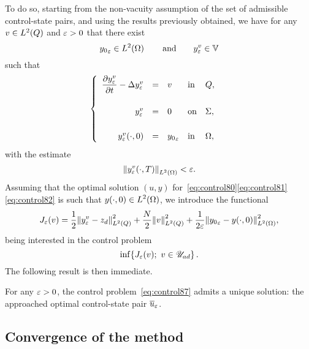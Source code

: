 To do so, starting from the non-vacuity assumption of the set of admissible
control-state pairs, and using the results previously obtained, we have for
any $v\in L^{2}\!\left({Q}\right)$ and $\varepsilon > 0$ that there exist
\begin{equation*}
    {y_{0}}_{\varepsilon}\in L^{2}\!\left({\Omega}\right)\qquad\text{and}\qquad y_{\varepsilon}^{v}\in
    \mathbb{V}
\end{equation*}
such that
\begin{equation*}
    \begin{cases}\displaystyle
        \begin{array}{rclll}
            \dfrac{\partial{}y_{\varepsilon}^{v}}{\partial{}t} - \Delta y_{\varepsilon}^{v} & = & v &
            \text{in} & Q,\\
            \\
            y_{\varepsilon}^{v} & = & 0 & \text{on} & \Sigma,\\
            \\
            {y_{\varepsilon}^{v}}\!\left({\cdot, 0}\right) & = & {y_{0}}_{\varepsilon} &
            \text{in} & \Omega,
        \end{array}
    \end{cases}
\end{equation*}
with the estimate
\begin{equation*}
    \normeohm{%
        \condfinale{y_{\veps}^{v}}
    } < \veps.
\end{equation*}
Assuming that the optimal solution $(u,y)$
for~\eqref{eq:control80}\eqref{eq:control81}\eqref{eq:control82} is such
that $\displaystyle {y}\!\left({\cdot, 0}\right)\in L^{2}\!\left({\Omega}\right)$, we introduce the
functional
\begin{equation*}
    J_{\varepsilon}(v) = \dfrac{1}{2}{\left\|{y_{\varepsilon}^{v} - z_{d} }\right\|}_{L^{2}\left({Q}\right)}^{2} +
    \dfrac{N}{2}{\left\|{v }\right\|}_{L^{2}\left({Q}\right)}^{2} + \dfrac{1}{2\varepsilon}{\left\|{{y_{0}}_{\varepsilon} -
    {y}\!\left({\cdot, 0}\right) }\right\|}_{L^{2}\left({\Omega}\right)}^{2},
\end{equation*}
being interested in the control problem
\begin{equation}\label{eq:control87}
    \inf\!\left\{{%
        J_{\veps}(v);\ v\in\uad
    }\right\}.
\end{equation}
The following result is then immediate.

\begin{proposition}%
    For any $\varepsilon > 0$, the control problem~\eqref{eq:control87} admits a
    unique solution: the approached optimal control-state pair ${\overline{u}}_{\varepsilon}$.
\end{proposition}

\subsection{Convergence of the method}\label{sec:convergence}

